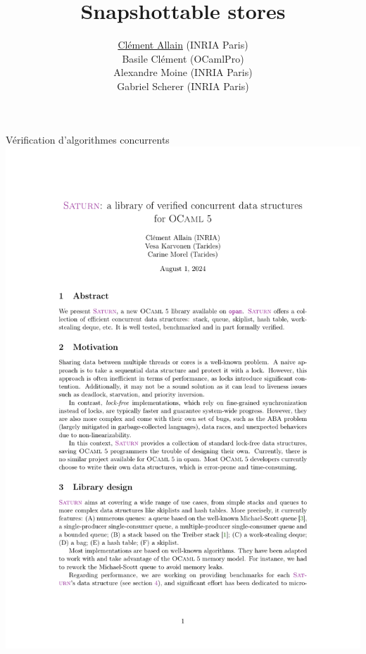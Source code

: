 \documentclass[usenames,dvipsnames]{beamer}
\title{
  Snapshottable stores
}
\author{
  \underline{Clément Allain} (INRIA Paris) \\
  Basile Clément (OCamlPro) \\
  Alexandre Moine (INRIA Paris) \\
  Gabriel Scherer (INRIA Paris)
}
\begin{document}

\begin{frame}
\titlepage
\end{frame}


\begin{frame}{Vérification d'algorithmes concurrents}
\includegraphics[scale=0.5]{images/allain-karvonen-morel-24.pdf}
\end{frame}

\end{document}

